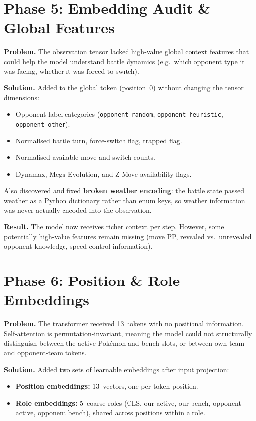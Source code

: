\section{Phase 5: Embedding Audit \& Global Features}

\textbf{Problem.} The observation tensor lacked high-value global context
features that could help the model understand battle dynamics (e.g.\ which
opponent type it was facing, whether it was forced to switch).

\textbf{Solution.} Added to the global token (position~0) without changing
the tensor dimensions:
\begin{itemize}
  \item Opponent label categories (\texttt{opponent\_random},
        \texttt{opponent\_heuristic}, \texttt{opponent\_other}).
  \item Normalised battle turn, force-switch flag, trapped flag.
  \item Normalised available move and switch counts.
  \item Dynamax, Mega Evolution, and Z-Move availability flags.
\end{itemize}

Also discovered and fixed \textbf{broken weather encoding}: the battle state
passed weather as a Python dictionary rather than enum keys, so weather
information was never actually encoded into the observation.

\textbf{Result.} The model now receives richer context per step.  However,
some potentially high-value features remain missing (move PP, revealed vs.\
unrevealed opponent knowledge, speed control information).

\section{Phase 6: Position \& Role Embeddings}

\textbf{Problem.} The transformer received 13~tokens with no positional
information.  Self-attention is permutation-invariant, meaning the model
could not structurally distinguish between the active Pok\'{e}mon and bench
slots, or between own-team and opponent-team tokens.

\textbf{Solution.} Added two sets of learnable embeddings after input
projection:
\begin{itemize}
  \item \textbf{Position embeddings:} 13~vectors, one per token position.
  \item \textbf{Role embeddings:} 5~coarse roles (CLS, our active, our bench,
        opponent active, opponent bench), shared across positions within a role.
\end{itemize}

